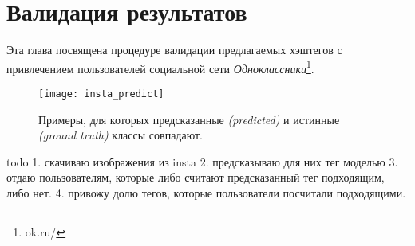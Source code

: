 \section{Валидация результатов}

\indent
\indent
Эта глава посвящена процедуре валидации предлагаемых 
хэштегов с привлечением пользователей социальной сети 
\textit{Одноклассники}\footnote{ok.ru/}.


\begin{figure}
    \begin{center}
   	    \texttt{[image: insta\_predict]}
   	\end{center}
   	\caption{Примеры, для которых предсказанные
   	 \textit{(predicted)} и истинные \textit{(ground truth)} классы совпадают.}
   	\label{tikzpicture: correct_predict}
\end{figure}



todo
1. скачиваю изображения из insta
2. предсказываю для них тег моделью
3. отдаю пользователям, которые либо считают предсказанный 
тег подходящим, либо нет.
4. привожу долю тегов, которые пользователи посчитали подходящими.